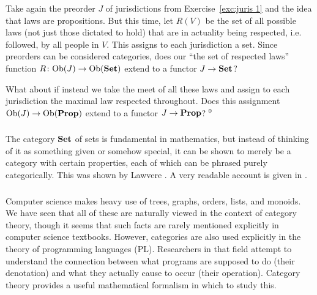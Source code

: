 \documentclass[CT4S-EN-RU]{subfiles}
\begin{document}
\begin{exerciseENG}\label{exc:juris 2}
Take again the preorder $J$ of jurisdictions from Exercise~\ref{exc:juris 1} and the idea that laws are propositions. But this time, let $R(V)$ be the set of all possible laws (not just those dictated to hold) that are in actuality being respected, i.e. followed, by all people in $V$. This assigns to each jurisdiction a set.
\sexc Since preorders can be considered categories, does our “the set of respected laws” function $R\colon\textnormal{Ob}(J)\rightarrow\textnormal{Ob}({\mathbf{Set}})$ extend to a functor $J\rightarrow{\mathbf{Set}}$? 
\item What about if instead we take the meet of all these laws and assign to each jurisdiction the maximal law respected throughout. Does this assignment $\textnormal{Ob}(J)\rightarrow\textnormal{Ob}({\mathbf{Prop}})$ extend to a functor $J\rightarrow{\mathbf{Prop}}$?$~^{\arabic{footnote}}$
\endsexc
\end{exerciseENG}

\begin{exerciseRUS}\label{exc:juris 2}
\end{exerciseRUS}


\subsubsection{}

\begin{blockENG}
The category ${\mathbf{Set}}$ of sets is fundamental in mathematics, but instead of thinking of it as something given or somehow special, it can be shown to merely be a category with certain properties, each of which can be phrased purely categorically. This was shown by Lawvere \cite{Law}. A very readable account is given in \cite{Le2}.
\end{blockENG}

\begin{blockRUS}
\end{blockRUS}


\subsubsection{}

\begin{blockENG}
Computer science makes heavy use of trees, graphs, orders, lists, and monoids. We have seen that all of these are naturally viewed in the context of category theory, though it seems that such facts are rarely mentioned explicitly in computer science textbooks. However, categories are also used explicitly in the theory of programming languages (PL). Researchers in that field attempt to understand the connection between what programs are supposed to do (their denotation) and what they actually cause to occur (their operation). Category theory provides a useful mathematical formalism in which to study this.
\end{blockENG}
\end{document}
